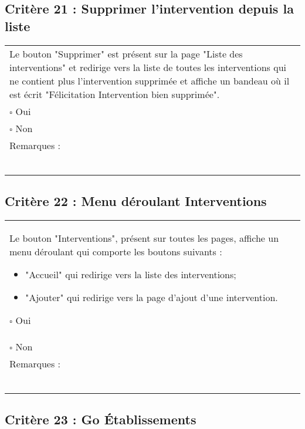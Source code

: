   		
  		
  			\subsection*{Critère 21 : Supprimer l'intervention depuis la liste}
	
	\begin{center}
    	 		\begin{tabular}[h]{|p{}|}
			\hline
				Le bouton "Supprimer" est présent sur la page "Liste des interventions" et redirige vers la liste de toutes les interventions qui ne contient plus l'intervention supprimée et affiche un bandeau où il est écrit "Félicitation Intervention bien supprimée".\\
				$\square$ Oui  \\ $\square$ Non \\\hline Remarques : \\ ~\\
			 \\\hline
     		\end{tabular}
  		\end{center}

  		
  			\subsection*{Critère 22 : Menu déroulant Interventions}
	
	\begin{center}
    	 		\begin{tabular}[h]{|p{}|}
			\hline
				Le bouton "Interventions", présent sur toutes les pages, affiche un menu déroulant qui comporte les boutons suivants : 
				\begin{itemize}
					\item "Accueil" qui redirige vers la liste des interventions;
					\item "Ajouter" qui redirige vers la page d'ajout d'une intervention.
				\end{itemize}
				$\square$ Oui  \\ $\square$ Non \\\hline Remarques : \\ ~\\
			 \\\hline
     		\end{tabular}
  		\end{center}
  		
  		
  		  	\subsection*{Critère 23 : Go Établissements}
	
